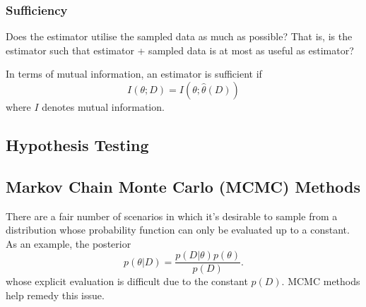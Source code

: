 \documentclass[11pt]{article}
\begin{document}
\begin{appendices}
\subsubsection{Sufficiency}
Does the estimator utilise the sampled data as much as possible? That is, is the estimator such that estimator + sampled data is at most as useful as estimator?

In terms of mutual information, an estimator is sufficient if
$$
I(\theta;D)=I(\theta;\hat{\theta}(D))
$$
where $I$ denotes mutual information.

\subsection{Hypothesis Testing}

\subsection{Markov Chain Monte Carlo (MCMC) Methods}
There are a fair number of scenarios in which it's desirable to sample from a distribution whose probability function can only be evaluated up to a constant. As an example, the posterior
$$
p(\theta|D)
=
\frac{p(D|\theta)p(\theta)}{p(D)}.
$$
whose explicit evaluation is difficult due to the constant $p(D)$. MCMC methods help remedy this issue.


\end{appendices}
\end{document}
